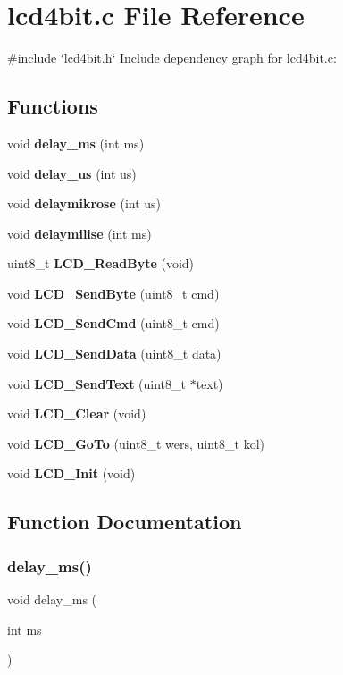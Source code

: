 \section{lcd4bit.\+c File Reference}
\label{lcd4bit_8c}
{\ttfamily \#include \char`\"{}lcd4bit.\+h\char`\"{}}\newline
Include dependency graph for lcd4bit.\+c\+:
\subsection*{Functions}
\begin{DoxyCompactItemize}
\item 
void \textbf{ delay\+\_\+ms} (int ms)
\item 
void \textbf{ delay\+\_\+us} (int us)
\item 
void \textbf{ delaymikrose} (int us)
\item 
void \textbf{ delaymilise} (int ms)
\item 
uint8\+\_\+t \textbf{ L\+C\+D\+\_\+\+Read\+Byte} (void)
\item 
void \textbf{ L\+C\+D\+\_\+\+Send\+Byte} (uint8\+\_\+t cmd)
\item 
void \textbf{ L\+C\+D\+\_\+\+Send\+Cmd} (uint8\+\_\+t cmd)
\item 
void \textbf{ L\+C\+D\+\_\+\+Send\+Data} (uint8\+\_\+t data)
\item 
void \textbf{ L\+C\+D\+\_\+\+Send\+Text} (uint8\+\_\+t $\ast$text)
\item 
void \textbf{ L\+C\+D\+\_\+\+Clear} (void)
\item 
void \textbf{ L\+C\+D\+\_\+\+Go\+To} (uint8\+\_\+t wers, uint8\+\_\+t kol)
\item 
void \textbf{ L\+C\+D\+\_\+\+Init} (void)
\end{DoxyCompactItemize}


\subsection{Function Documentation}
\mbox{\label{lcd4bit_8c_a8aa473f8ae9a91df4bc9ea700983c72d}} 
\subsubsection{delay\+\_\+ms()}
{\footnotesize\ttfamily void delay\+\_\+ms (\begin{DoxyParamCaption}\item[{int}]{ms }\end{DoxyParamCaption})}

